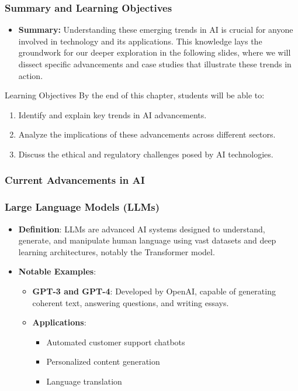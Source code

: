 \documentclass[aspectratio=169]{beamer}
\begin{document}
\begin{frame}[fragile]
    \frametitle{Summary and Learning Objectives}
    \begin{itemize}
        \item \textbf{Summary:} Understanding these emerging trends in AI is crucial for anyone involved in technology and its applications. This knowledge lays the groundwork for our deeper exploration in the following slides, where we will dissect specific advancements and case studies that illustrate these trends in action.
    \end{itemize}
    
    \vspace{10pt}

    \begin{block}{Learning Objectives}
        By the end of this chapter, students will be able to:
        \begin{enumerate}
            \item Identify and explain key trends in AI advancements.
            \item Analyze the implications of these advancements across different sectors.
            \item Discuss the ethical and regulatory challenges posed by AI technologies.
        \end{enumerate}
    \end{block}
\end{frame}

\begin{frame}[fragile]
    \frametitle{Current Advancements in AI}
    \tableofcontents[hideallsubsections]
\end{frame}

\begin{frame}[fragile]
    \frametitle{Large Language Models (LLMs)}
    \begin{itemize}
        \item \textbf{Definition}: 
        LLMs are advanced AI systems designed to understand, generate, and manipulate human language using vast datasets and deep learning architectures, notably the Transformer model.
        \item \textbf{Notable Examples}:
            \begin{itemize}
                \item \textbf{GPT-3 and GPT-4}: Developed by OpenAI, capable of generating coherent text, answering questions, and writing essays.
                \item \textbf{Applications}:
                    \begin{itemize}
                        \item Automated customer support chatbots
                        \item Personalized content generation
                        \item Language translation
                    \end{itemize}
            \end{itemize}
    \end{itemize}
\end{frame}
\end{document}
